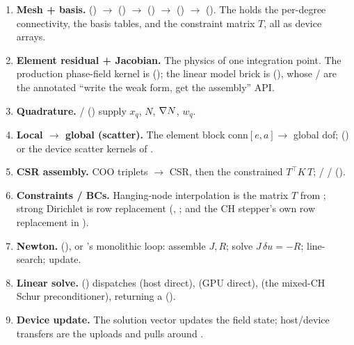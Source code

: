 \begin{enumerate}[nosep]
  \item \textbf{Mesh + basis.}
         () $\to$
         () $\to$
         () $\to$
         () $\to$
         (). The
         holds the per-degree connectivity, the basis
        tables, and the constraint matrix $T$, all as device arrays.
  \item \textbf{Element residual + Jacobian.} The physics of one
        integration point. The production phase-field kernel is
         (); the
        linear model brick is 
        (), whose /
         are the annotated ``write the weak form, get
        the assembly'' API.
  \item \textbf{Quadrature.}  / 
        () supply $x_q$, $N$, $\nabla N$, $w_q$.
  \item \textbf{Local $\to$ global (scatter).} The element block
        $\mathrm{conn}[e,a]\!\to$ global dof; 
        () or the device scatter kernels of
        .
  \item \textbf{CSR assembly.} COO triplets $\to$ CSR, then the
        constrained $T^{\!\top}\!K\,T$;  /
         / 
        ().
  \item \textbf{Constraints / BCs.} Hanging-node interpolation is the
        matrix $T$ from ; strong Dirichlet is row
        replacement (, ; and
        the CH stepper's own row replacement in ).
  \item \textbf{Newton.}  (),
        or 's monolithic loop: assemble
        $J,R$; solve $J\,\delta u=-R$; line-search; update.
  \item \textbf{Linear solve.} 
        () dispatches  (host direct),
         (GPU direct),  (the mixed-CH Schur
        preconditioner), returning a 
        ().
  \item \textbf{Device update.} The solution vector updates the field
        state; host/device transfers are the  uploads
        and  pulls around .
\end{enumerate}

